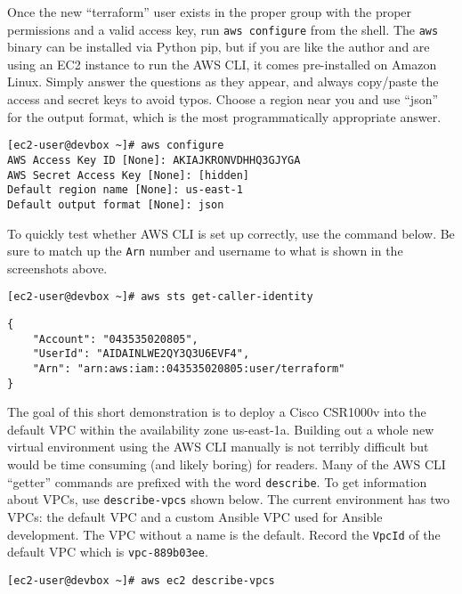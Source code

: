 Once the new ``terraform'' user exists in the proper group with the proper
permissions and a valid access key, run \verb|aws configure| from the shell. The
\verb|aws| binary can be installed via Python pip, but if you are like the author
and are using an EC2 instance to run the AWS CLI, it comes pre-installed on
Amazon Linux. Simply answer the questions as they appear, and always
copy/paste the access and secret keys to avoid typos. Choose a region near you
and use ``json'' for the output format, which is the most programmatically
appropriate answer.

\begin{verbatim}
[ec2-user@devbox ~]# aws configure
AWS Access Key ID [None]: AKIAJKRONVDHHQ3GJYGA
AWS Secret Access Key [None]: [hidden]
Default region name [None]: us-east-1
Default output format [None]: json
\end{verbatim}

To quickly test whether AWS CLI is set up correctly, use the command below. Be
sure to match up the \verb|Arn| number and username to what is shown in the
screenshots above.

\begin{verbatim}
[ec2-user@devbox ~]# aws sts get-caller-identity
\end{verbatim}

\begin{verbatim}
{
    "Account": "043535020805", 
    "UserId": "AIDAINLWE2QY3Q3U6EVF4", 
    "Arn": "arn:aws:iam::043535020805:user/terraform"
}
\end{verbatim}

The goal of this short demonstration is to deploy a Cisco CSR1000v into the
default VPC within the availability zone us-east-1a. Building out a whole new
virtual environment using the AWS CLI manually is not terribly difficult but
would be time consuming (and likely boring) for readers. Many of the AWS CLI
``getter'' commands are prefixed with the word \verb|describe|. To get information
about VPCs, use \verb|describe-vpcs| shown below. The current environment has two
VPCs: the default VPC and a custom Ansible VPC used for Ansible development.
The VPC without a name is the default. Record the \verb|VpcId| of the default VPC
which is \verb|vpc-889b03ee|.

\begin{verbatim}
[ec2-user@devbox ~]# aws ec2 describe-vpcs
\end{verbatim}

